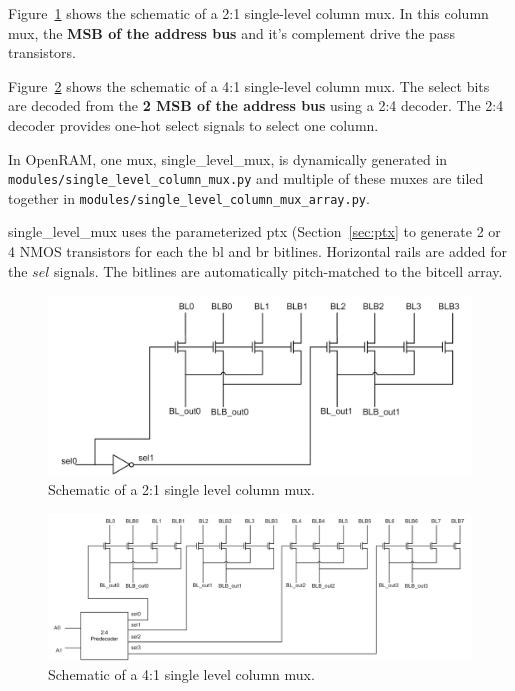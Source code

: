 Figure~\ref{fig:2t1_single_level_column_mux} shows the schematic of a
2:1 single-level column mux. In this column mux, the {\bf MSB of the
  address bus} and it's complement drive the pass transistors.

Figure~\ref{fig:4t1_single_level_column_mux} shows the schematic of a
4:1 single-level column mux. The select bits are decoded from the {\bf
  2 MSB of the address bus} using a 2:4 decoder.  The 2:4 decoder
provides one-hot select signals to select one column.

In OpenRAM, one mux, single\_level\_mux, is dynamically generated in
\verb|modules/single_level_column_mux.py| and multiple of these muxes
are tiled together in \verb|modules/single_level_column_mux_array.py|.

single\_level\_mux uses the parameterized ptx (Section~\ref{sec:ptx}
to generate 2 or 4 NMOS transistors for each the bl and br
bitlines. Horizontal rails are added for the $sel$ signals.  The
bitlines are automatically pitch-matched to the bitcell array.


\begin{figure}[h!]
\centering
\includegraphics[scale=.5]{./figs/2t1_single_level_column_mux.pdf}
\caption{Schematic of a 2:1 single level column mux. }
\label{fig:2t1_single_level_column_mux}
\end{figure}



\begin{figure}[h!]
\centering
\includegraphics[scale=.5]{./figs/4t1_single_level_column_mux.pdf}
\caption{Schematic of a 4:1 single level column mux. }
\label{fig:4t1_single_level_column_mux}
\end{figure}


